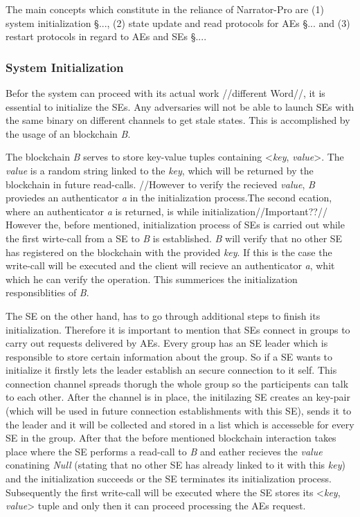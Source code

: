 The main concepts which constitute in the reliance of Narrator-Pro are (1) system initialization §..., (2) state update and read protocols for AEs §... and (3) restart protocols in regard to AEs and SEs §....

\subsubsection{System Initialization}

Befor the system can proceed with its actual work //different Word//, it is essential to initialize the SEs. Any adversaries will not be able to launch SEs with the same binary on different channels to get stale states. This is accomplished by the usage of an blockchain \textit{B}. 

The blockchain \textit{B} serves to store key-value tuples containing <\textit{key}, \textit{value}>. The \textit{value} is a random string linked to the \textit{key}, which will be returned by the blockchain in future read-calls. 
//However to verify the recieved \textit{value}, \textit{B} proviedes an authenticator \textit{a} in the initialization process.The second ecation, where an authenticator \textit{a} is returned, is while initialization//Important??// 
However the, before mentioned, initialization process of SEs is carried out while the first wirte-call from a SE to \textit{B} is established. \textit{B} will verify that no other SE has registered on the blockchain with the provided \textit{key}. If this is the case the write-call will be executed and the client will recieve an authenticator \textit{a}, whit which he can verify the operation. This summerices the initialization responsiblities of \textit{B}.

The SE on the other hand, has to go through additional steps to finish its initialization. Therefore it is important to mention that SEs connect in groups to carry out requests delivered by AEs. Every group has an SE leader which is responsible to store certain information about the group. So if a SE wants to initialize it firstly lets the leader establish an secure connection to it self. This connection channel spreads thorugh the whole group so the participents can talk to each other. After the channel is in place, the initilazing SE creates an key-pair (which will be used in future connection establishments with this SE), sends it to the leader and it will be collected and stored in a list which is accesseble for every SE in the group. After that the before mentioned blockchain interaction takes place where the SE performs a read-call to \textit{B} and eather recieves the \textit{value} conatining \textit{Null} (stating that no other SE has already linked to it with this \textit{key}) and the initialization succeeds or the SE terminates its initialization process. Subsequently the first write-call will be executed where the SE stores its <\textit{key}, \textit{value}> tuple and only then it can proceed processing the AEs request.

